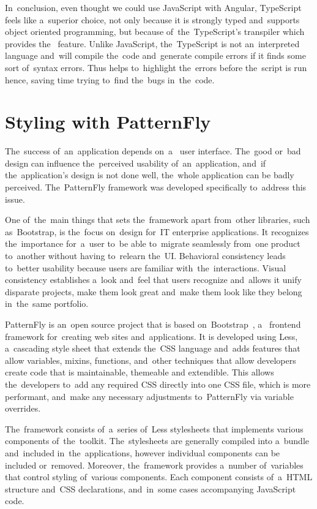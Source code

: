 In~conclusion, even thought we could use JavaScript with Angular, TypeScript
feels like a~superior choice, not only because it is strongly typed and~supports
object oriented programming, but because of~the~TypeScript's transpiler which
provides the~ feature. Unlike JavaScript,
the~TypeScript is not an~interpreted language and~will compile the~code
and~generate compile errors if it finds some sort of~syntax errors. Thus
helps to~highlight the~errors before the~script is run hence, saving time trying
to~find the~bugs in~the~code.


\section{Styling with PatternFly}
The~success of~an~application depends on~a~ user interface.
The~good or~bad design can influence the~perceived usability of~an~application,
and~if the~application's design is not done well, the~whole application can be badly perceived.
The~PatternFly framework was developed specifically to~address
this issue.

One of~the~main things that sets the~framework apart from~other libraries, such
as~Bootstrap, is the~focus on~design for~IT enterprise applications. It
recognizes the~importance for~a~user to~be able to~migrate seamlessly from~one
product to~another without having to~relearn the~UI. Behavioral consistency
leads to~better usability because users are familiar with~the~interactions.
Visual consistency establishes a~look and~feel that users recognize and~allows
it unify disparate projects, make them look great and~make them look like they
belong in~the~same portfolio.

PatternFly is an~open source project that is based
on~Bootstrap~\cite{Bootstrap}, a~ frontend framework
for~creating web sites and~applications. It is developed using Less, a~cascading
style sheet  that extends the~CSS language and~adds features
that allow variables, mixins, functions, and~other techniques that allow
developers create code that is maintainable, themeable and extendible. This
allows the~developers to~add any required  CSS directly into
one CSS file, which is more performant, and~make any necessary adjustments
to~PatternFly via variable overrides.

The~framework consists of~a~series of~Less stylesheets that implements various
components of~the~toolkit. The~stylesheets are generally compiled into a~bundle
and~included in~the~applications, however individual components can be included
or~removed. Moreover, the~framework provides a~number of~variables that control
styling of~various components. Each component consists of~a~HTML structure
and~CSS declarations, and~in~some cases accompanying JavaScript code.



